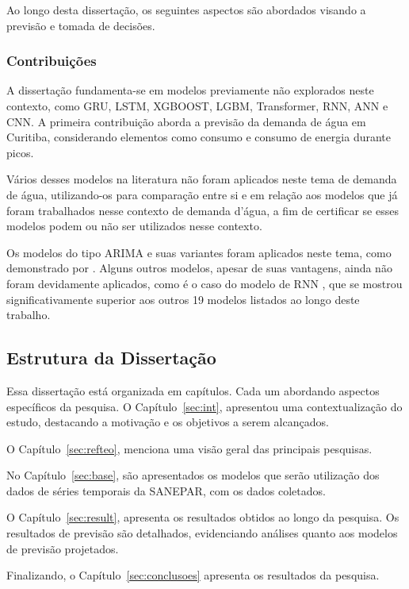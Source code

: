 Ao longo desta dissertação, os seguintes aspectos são abordados visando a previsão e tomada de decisões.

\subsubsection{Contribui\c c\~oes} \label{subsubsec:Contribuição}


A dissertação fundamenta-se em modelos previamente não explorados neste contexto, como GRU, LSTM, XGBOOST, LGBM, Transformer, RNN, ANN e CNN. A primeira contribuição aborda a previsão da demanda de água em Curitiba, considerando elementos como consumo e consumo de energia durante picos.

Vários desses modelos na literatura não foram aplicados neste tema de demanda de água, utilizando-os para comparação entre si e em relação aos modelos que já foram trabalhados nesse contexto de demanda d'água, a fim de certificar se esses modelos podem ou não ser utilizados nesse contexto.

Os modelos do tipo ARIMA e suas variantes foram aplicados neste tema, como demonstrado por \cite{2-s2.0-85069459067, 2-s2.0-85099424908}. Alguns outros modelos, apesar de suas vantagens, ainda não foram devidamente aplicados, como é o caso do modelo de RNN \cite{2-s2.0-85067419084}, que se mostrou significativamente superior aos outros 19 modelos listados ao longo deste trabalho.

\subsection{Estrutura da Disserta\c c\~ao} \label{subsec:estrutura}


Essa dissertação está organizada em capítulos. Cada um abordando aspectos específicos da pesquisa. 
O Capítulo~\ref{sec:int},  apresentou uma contextualização do estudo, destacando a motivação e os objetivos a serem alcançados. 

O Capítulo~\ref{sec:refteo}, menciona uma visão geral das principais pesquisas.

No Capítulo~\ref{sec:base}, são apresentados os modelos que serão utilização dos dados de séries temporais da SANEPAR, com os dados coletados.


O Capítulo~\ref{sec:result}, apresenta os resultados obtidos ao longo da pesquisa.  Os resultados de previsão são detalhados, evidenciando análises quanto aos modelos de previsão projetados.

Finalizando, o Capítulo~\ref{sec:conclusoes} apresenta os resultados da pesquisa.



